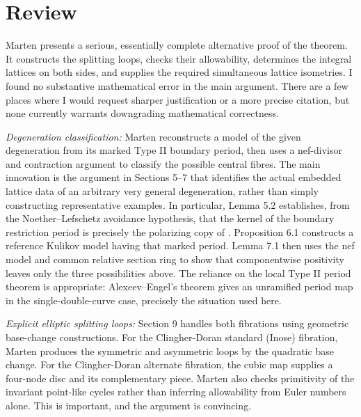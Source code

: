 \documentclass[11pt]{article}
\theoremstyle{definition}
\theoremstyle{remark}
\begin{document}
\maketitle

\section{Review}
{\color{gray}

Marten presents a serious, essentially complete alternative proof of the theorem. It constructs the splitting loops, checks their allowability, determines the integral lattices on both sides, and supplies the required simultaneous lattice isometries.  I found no substantive mathematical error in the main argument. There are a few places where I would request sharper justification or a more precise citation, but none currently warrants downgrading mathematical correctness. \vspace{.125in}

\noindent
{\em Degeneration classification:} Marten reconstructs a model of the given degeneration from its marked Type II boundary period, then uses a nef-divisor and contraction argument to classify the possible central fibres. 
The main innovation is the argument in Sections 5–7 that identifies the actual embedded lattice data of an arbitrary very general degeneration, rather than simply constructing representative examples.
In particular, Lemma 5.2 establishes, from the Noether–Lefschetz avoidance hypothesis, that the kernel of the boundary restriction period is precisely the polarizing copy of . Proposition 6.1 constructs a reference Kulikov model having that marked period. Lemma 7.1 then uses the nef model and common relative section ring to show that componentwise positivity leaves only the three possibilities above.
The reliance on the local Type II period theorem is appropriate: Alexeev–Engel’s theorem gives an unramified period map in the single-double-curve case, precisely the situation used here. \vspace{.125in}

\noindent
{\em Explicit elliptic splitting loops:}  Section 9 handles both fibrations using geometric base-change constructions.
For the Clingher-Doran standard (Inose) fibration, Marten produces the symmetric and asymmetric loops by the quadratic base change. For the Clingher-Doran alternate fibration, the cubic map supplies a four-node disc and its complementary piece. Marten also checks primitivity of the invariant point-like cycles rather than inferring allowability from Euler numbers alone. This is important, and the argument is convincing. \vspace{.125in}

}
\end{document}
